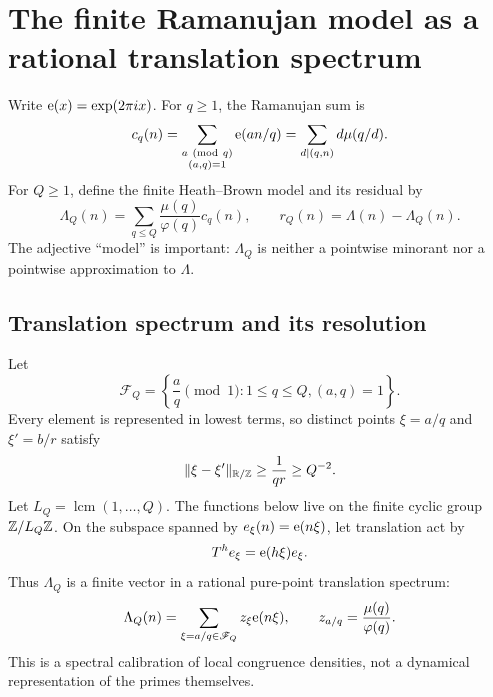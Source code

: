 \section{The finite Ramanujan model as a rational translation spectrum}
\label{sec:ramanujan-dynamics}

Write $\mathrm e(x)=\exp(2\pi i x)$.  For $q\geq1$, the Ramanujan sum is
\begin{equation}
 c_q(n)=\sum_{\substack{a\ ({\rm mod}\ q)\\(a,q)=1}}
 \e(an/q)
 =\sum_{d\mid(q,n)}d\mu(q/d).
 \label{eq:ramanujan-sum-def}
\end{equation}
For $Q\geq1$, define the finite Heath--Brown model and its residual by
\begin{equation}
 \Lambda_Q(n)=\sum_{q\leq Q}\frac{\mu(q)}{\varphi(q)}c_q(n),
 \qquad
 r_Q(n)=\Lambda(n)-\Lambda_Q(n).
 \label{eq:HB-model-def}
\end{equation}
The adjective ``model'' is important: $\Lambda_Q$ is neither a pointwise
minorant nor a pointwise approximation to $\Lambda$.

\subsection{Translation spectrum and its resolution}

Let
\begin{equation}
 \mathscr F_Q=
 \left\{\frac aq\pmod1:1\leq q\leq Q, (a,q)=1\right\}.
 \label{eq:farey-spectrum}
\end{equation}
Every element is represented in lowest terms, so distinct points
$\xi=a/q$ and $\xi'=b/r$ satisfy
\begin{equation}
 \|\xi-\xi'\|_{\mathbb R/\mathbb Z}
 \geq\frac1{qr}\geq Q^{-2}.
 \label{eq:farey-gap}
\end{equation}
Let $L_Q=\operatorname{lcm}(1,\ldots,Q)$.  The functions below live on
the finite cyclic group $\mathbb Z/L_Q\mathbb Z$.  On the subspace spanned by
$e_\xi(n)=\mathrm e(n\xi)$, let translation act by
\begin{equation}
 T^he_\xi=\mathrm e(h\xi)e_\xi.
 \label{eq:translation-spectrum-action}
\end{equation}
Thus $\Lambda_Q$ is a finite vector in a rational pure-point translation
spectrum:
\begin{equation}
 \Lambda_Q(n)=
 \sum_{\xi=a/q\in\mathscr F_Q}
 z_\xi\mathrm e(n\xi),
 \qquad z_{a/q}=\frac{\mu(q)}{\varphi(q)}.
 \label{eq:HB-spectral-expansion}
\end{equation}
This is a spectral calibration of local congruence densities, not a
dynamical representation of the primes themselves.


